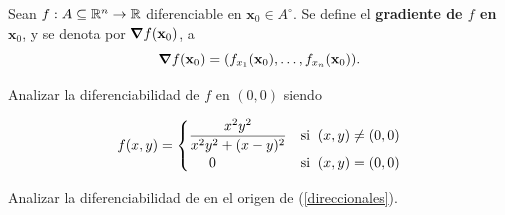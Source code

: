 \begin{definition}  Sean $f: A  \subseteq  \mathbb{R}^n \to \mathbb{R}$  diferenciable en $\mathbf{x}_0 \in A^{\circ}$. Se define el \textbf{gradiente de $f$ en  $\mathbf{x}_0$}, y se denota por $ \grad f (\mathbf{x}_0)$, a
$$ \grad f (\mathbf{x}_0) =  (f_{x_1}(\mathbf{x}_0), \dots ,f_{x_n}(\mathbf{x}_0) ). $$
\end{definition}

 
\begin{tarea}  Analizar la diferenciabilidad de $f$  en $(0,0)$  siendo

 $$ f(x,y) = \begin{cases}   \dfrac{ x^{2}y^{2} }{ x^{2}y^{2}+(x-y)^{2}} & \text{si}\;\; (x,y) \neq (0,0) \\
           \hspace{0.5cm}0 & \text{si}\;\; (x,y) = (0,0)
          \end{cases}$$
\end{tarea}





\begin{tarea}
Analizar  la diferenciabilidad de en el origen de (\ref{direccionales}).
\end{tarea}







